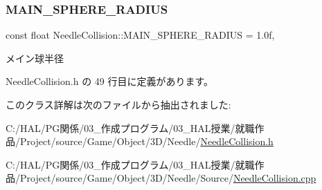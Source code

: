 \mbox{\label{class_needle_collision_accb402dfcaa534d5ac14a01d58c1d843}} 
\subsubsection{\texorpdfstring{M\+A\+I\+N\+\_\+\+S\+P\+H\+E\+R\+E\+\_\+\+R\+A\+D\+I\+US}{MAIN\_SPHERE\_RADIUS}}
{\footnotesize\ttfamily const float Needle\+Collision\+::\+M\+A\+I\+N\+\_\+\+S\+P\+H\+E\+R\+E\+\_\+\+R\+A\+D\+I\+US = 1.\+0f\hspace{0.3cm}{\ttfamily [static]}, {\ttfamily [private]}}



メイン球半径 



 Needle\+Collision.\+h の 49 行目に定義があります。



このクラス詳解は次のファイルから抽出されました\+:\begin{DoxyCompactItemize}
\item 
C\+:/\+H\+A\+L/\+P\+G関係/03\+\_\+作成プログラム/03\+\_\+\+H\+A\+L授業/就職作品/\+Project/source/\+Game/\+Object/3\+D/\+Needle/\mbox{\hyperlink{_needle_collision_8h}{Needle\+Collision.\+h}}\item 
C\+:/\+H\+A\+L/\+P\+G関係/03\+\_\+作成プログラム/03\+\_\+\+H\+A\+L授業/就職作品/\+Project/source/\+Game/\+Object/3\+D/\+Needle/\+Source/\mbox{\hyperlink{_needle_collision_8cpp}{Needle\+Collision.\+cpp}}\end{DoxyCompactItemize}
